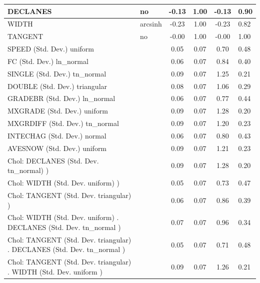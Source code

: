 \begin{table}
\begin{center}
\begin{tabular}{|l|l|c|c|c|l|}
			\hline
			DECLANES & no & -0.13 & 1.00 & -0.13 & 0.90 \\
			\hline
			WIDTH & arcsinh & -0.23 & 1.00 & -0.23 & 0.82 \\
			\hline
			TANGENT & no & -0.00 & 1.00 & -0.00 & 1.00 \\
			\hline
			SPEED (Std. Dev.) uniform &  & 0.05 & 0.07 & 0.70 & 0.48 \\
			\hline
			FC (Std. Dev.) ln_normal &  & 0.06 & 0.07 & 0.84 & 0.40 \\
			\hline
			SINGLE (Std. Dev.) tn_normal &  & 0.09 & 0.07 & 1.25 & 0.21 \\
			\hline
			DOUBLE (Std. Dev.) triangular &  & 0.08 & 0.07 & 1.06 & 0.29 \\
			\hline
			GRADEBR (Std. Dev.) ln_normal &  & 0.06 & 0.07 & 0.77 & 0.44 \\
			\hline
			MXGRADE (Std. Dev.) uniform &  & 0.09 & 0.07 & 1.28 & 0.20 \\
			\hline
			MXGRDIFF (Std. Dev.) tn_normal &  & 0.09 & 0.07 & 1.20 & 0.23 \\
			\hline
			INTECHAG (Std. Dev.) normal &  & 0.06 & 0.07 & 0.80 & 0.43 \\
			\hline
			AVESNOW (Std. Dev.) uniform &  & 0.09 & 0.07 & 1.21 & 0.23 \\
			\hline
			 Chol: DECLANES (Std. Dev. tn_normal) ) &  & 0.09 & 0.07 & 1.28 & 0.20 \\
			\hline
			 Chol: WIDTH (Std. Dev. uniform) ) &  & 0.05 & 0.07 & 0.73 & 0.47 \\
			\hline
			 Chol: TANGENT (Std. Dev. triangular) ) &  & 0.06 & 0.07 & 0.86 & 0.39 \\
			\hline
			 Chol: WIDTH (Std. Dev. uniform) . DECLANES (Std. Dev.   tn_normal ) &  & 0.07 & 0.07 & 0.96 & 0.34 \\
			\hline
			 Chol: TANGENT (Std. Dev. triangular) . DECLANES (Std. Dev.   tn_normal ) &  & 0.05 & 0.07 & 0.71 & 0.48 \\
			\hline
			 Chol: TANGENT (Std. Dev. triangular) . WIDTH (Std. Dev.   uniform ) &  & 0.09 & 0.07 & 1.26 & 0.21 \\
			\hline
		\end{tabular}
	\end{center}
\end{table}